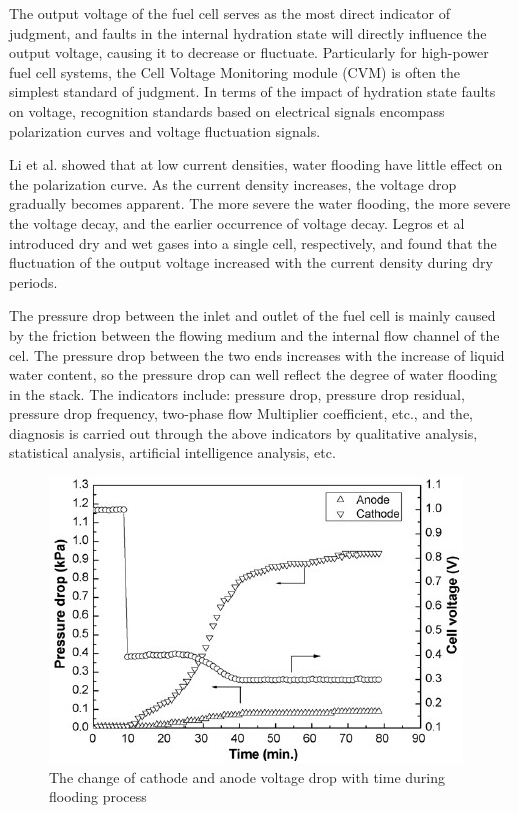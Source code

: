 \par
The output voltage of the fuel cell serves as the most direct indicator of judgment, and faults in the internal hydration state will directly influence the output voltage, causing it to decrease or fluctuate. Particularly for high-power fuel cell systems, the Cell Voltage Monitoring module (CVM) is often the simplest standard of judgment. In terms of the impact of hydration state faults on voltage, recognition standards based on electrical signals encompass polarization curves and voltage fluctuation signals.
\par
Li et al.\cite{liReviewWaterFlooding2008} showed that at low current densities, water flooding have little effect on the polarization curve. As the current density increases, the voltage drop gradually becomes apparent. The more severe the water flooding, the more severe the voltage decay, and the earlier occurrence of voltage decay. Legros et al\cite{legrosFirstResultsPEMFC2011} introduced dry and wet gases into a single cell, respectively, and found that the fluctuation of the output voltage increased with the current density during dry periods.
\par
The pressure drop between the inlet and outlet of the fuel cell is mainly caused by the friction between the flowing medium and the internal flow channel of the cel\cite{wuDiagnosticToolsPEM2008}. The pressure drop between the two ends increases with the increase of liquid water content, so the pressure drop can well reflect the degree of water flooding in the stack. The indicators include: pressure drop, pressure drop residual, pressure drop frequency, two-phase flow Multiplier coefficient, etc., and the, diagnosis is carried out through the above indicators by qualitative analysis, statistical analysis, artificial intelligence analysis, etc.\cite{liNovelApproachDetermine2017}
\par
\begin{figure}[h]
    \centering
    \label{fig:figure1}
    \includegraphics{Research_pictures/Fig1.jpg}
    \caption[short]{The change of cathode and anode voltage drop with time during flooding process}
\end{figure}
